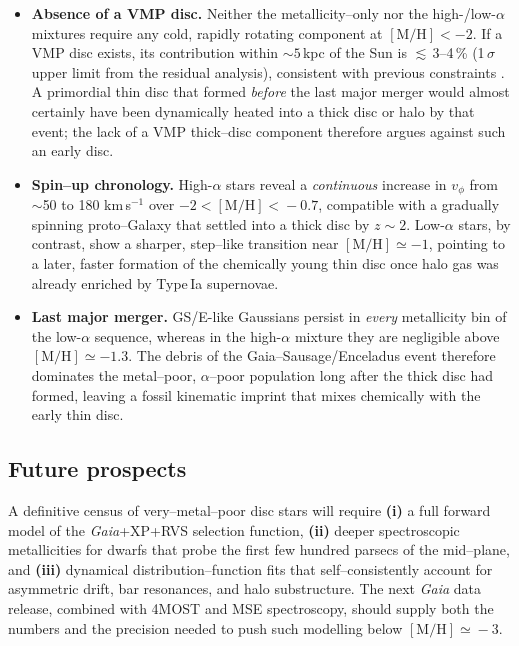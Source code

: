 \documentclass[a4paper,12pt]{article}
\begin{document}
\begin{itemize}\setlength\itemsep{4pt}
\item \textbf{Absence of a VMP disc.}  
  Neither the metallicity–only nor the high-/low-$\alpha$ mixtures
  require any cold, rapidly rotating component at
  $[\mathrm{M/H}]<-2$.  If a VMP disc exists, its
  contribution within $\sim5$\,kpc of the Sun is
  $\lesssim$\,3–4\,\% (1\,$\sigma$ upper limit from the residual
  analysis), consistent with previous constraints
  \citep[e.g.][]{Sestito2019, Venn2020}.  A primordial thin disc that
  formed \emph{before} the last major merger would almost certainly
  have been dynamically heated into a thick disc or halo by that
  event; the lack of a VMP thick–disc component therefore argues
  against such an early disc.

\item \textbf{Spin–up chronology.}  
  High-$\alpha$ stars reveal a \emph{continuous} increase in
  $v_\phi$ from $\sim$50 to 180 km\,s$^{-1}$ over
  $-2\!<\![\mathrm{M/H}]\!<\!-0.7$, compatible with a gradually
  spinning proto–Galaxy that settled into a thick disc by
  $z\!\sim\!2$.  Low-$\alpha$ stars, by contrast, show a sharper,
  step–like transition near $[\mathrm{M/H}]\simeq-1$, pointing to a
  later, faster formation of the chemically young thin disc once halo
  gas was already enriched by Type\,Ia supernovae.

\item \textbf{Last major merger.}  
  GS/E-like Gaussians persist in \emph{every} metallicity bin of the
  low-$\alpha$ sequence, whereas in the high-$\alpha$ mixture they are
  negligible above $[\mathrm{M/H}]\simeq-1.3$.  The debris of the
  Gaia–Sausage/Enceladus event therefore dominates the metal–poor,
  $\alpha$--poor population long after the thick disc had formed,
  leaving a fossil kinematic imprint that mixes chemically with the
  early thin disc.

\end{itemize}

\subsection{Future prospects}
\label{subsec:future}

A definitive census of very–metal–poor disc stars will require
\textbf{(i)} a full forward model of the \textit{Gaia}+XP+RVS
selection function, \textbf{(ii)} deeper spectroscopic metallicities
for dwarfs that probe the first few hundred parsecs of the mid–plane,
and \textbf{(iii)} dynamical distribution–function fits that
self–consistently account for asymmetric drift, bar resonances, and
halo substructure.  
The next \textit{Gaia} data release, combined with 4MOST and MSE
spectroscopy, should supply both the numbers and the precision needed
to push such modelling below $[\mathrm{M/H}]\!\simeq\!-3$.
\end{document}
